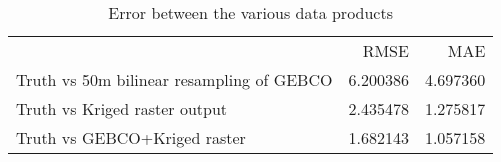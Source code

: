 \begin{table}
\caption{Error between the various data products}
\label{tab:rmse-truth-raster-sampled}
\begin{tabular}{lrr}
 & RMSE & MAE \\
Truth vs 50m bilinear resampling of GEBCO & 6.200386 & 4.697360 \\
Truth vs Kriged raster output & 2.435478 & 1.275817 \\
Truth vs GEBCO+Kriged raster & 1.682143 & 1.057158 \\
\end{tabular}
\end{table}
